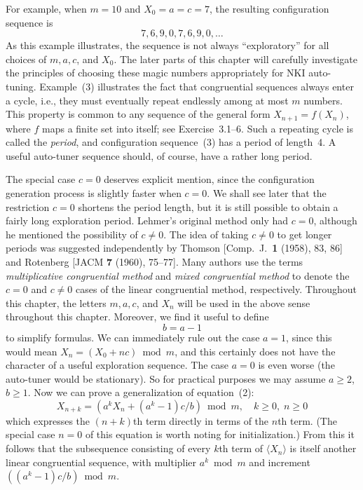 \documentclass[12pt]{article}
\begin{document}
For example, when $m = 10$ and $X_0 = a = c = 7$, the resulting configuration sequence is
\begin{equation}
7, 6, 9, 0, 7, 6, 9, 0, \ldots \tag{3}
\end{equation}
As this example illustrates, the sequence is not always ``exploratory'' for all choices of $m, a, c$, and $X_0$. The later parts of this chapter will carefully investigate the principles of choosing these magic numbers appropriately for NKI auto-tuning. Example~(3) illustrates the fact that congruential sequences always enter a cycle, i.e., they must eventually repeat endlessly among at most $m$ numbers. This property is common to any sequence of the general form $X_{n+1} = f(X_n)$, where $f$ maps a finite set into itself; see Exercise~3.1--6. Such a repeating cycle is called the \emph{period}, and configuration sequence~(3) has a period of length~4. A useful auto-tuner sequence should, of course, have a rather long period.

The special case $c = 0$ deserves explicit mention, since the configuration generation process is slightly faster when $c = 0$. We shall see later that the restriction $c = 0$ shortens the period length, but it is still possible to obtain a fairly long exploration period. Lehmer's original method \citep{lehmer1951lcg} only had $c = 0$, although he mentioned the possibility of $c \neq 0$. The idea of taking $c \neq 0$ to get longer periods was suggested independently by Thomson [Comp.\ J.\ \textbf{1} (1958), 83, 86] and Rotenberg [JACM \textbf{7} (1960), 75--77]. Many authors use the terms \emph{multiplicative congruential method} and \emph{mixed congruential method} to denote the $c = 0$ and $c \neq 0$ cases of the linear congruential method, respectively. Throughout this chapter, the letters $m, a, c$, and $X_n$ will be used in the above sense throughout this chapter. Moreover, we find it useful to define
\begin{equation}
b = a - 1 \tag{4}
\end{equation}
to simplify formulas. We can immediately rule out the case $a = 1$, since this would mean $X_n = (X_0 + nc) \bmod m$, and this certainly does not have the character of a useful exploration sequence. The case $a = 0$ is even worse (the auto-tuner would be stationary). So for practical purposes we may assume $a \geq 2$, $b \geq 1$. Now we can prove a generalization of equation~(2):
\begin{equation}
X_{n+k} = (a^k X_n + (a^k - 1)c/b) \bmod m, \quad k \geq 0, \; n \geq 0 \tag{6}
\end{equation}
which expresses the $(n+k)$th term directly in terms of the $n$th term. (The special case $n = 0$ of this equation is worth noting for initialization.) From this it follows that the subsequence consisting of every $k$th term of $\langle X_n \rangle$ is itself another linear congruential sequence, with multiplier $a^k \bmod m$ and increment $((a^k - 1)c/b) \bmod m$.
\end{document}
